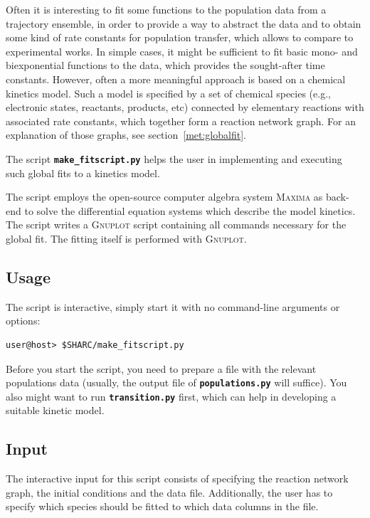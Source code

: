 \documentclass[a4paper,10pt,DIV=15,openany]{scrbook}
\newcommand{\ttt}[1]{\textbf{\texttt{#1}}}
\begin{document}
Often it is interesting to fit some functions to the population data from a trajectory ensemble, in order to provide a way to abstract the data and to obtain some kind of rate constants for population transfer, which allows to compare to experimental works.
In simple cases, it might be sufficient to fit basic mono- and biexponential functions to the data, which provides the sought-after time constants.
However, often a more meaningful approach is based on a chemical kinetics model.
Such a model is specified by a set of chemical species (e.g., electronic states, reactants, products, etc) connected by elementary reactions with associated rate constants, which together form a reaction network graph.
For an explanation of those graphs, see section~\ref{met:globalfit}.

The script \ttt{make\_fitscript.py} helps the user in implementing and executing such global fits to a kinetics model.

The script employs the open-source computer algebra system \textsc{Maxima} as back-end to solve the differential equation systems which describe the model kinetics.
The script writes a \textsc{Gnuplot} script containing all commands necessary for the global fit. 
The fitting itself is performed with \textsc{Gnuplot}.

\subsection{Usage}

The script is interactive, simply start it with no command-line arguments or options:
\begin{verbatim}
user@host> $SHARC/make_fitscript.py
\end{verbatim}

Before you start the script, you need to prepare a file with the relevant populations data (usually, the output file of \ttt{populations.py} will suffice).
You also might want to run \ttt{transition.py} first, which can help in developing a suitable kinetic model.

\subsection{Input}

The interactive input for this script consists of specifying the reaction network graph, the initial conditions and the data file.
Additionally, the user has to specify which species should be fitted to which data columns in the file.
\end{document}
